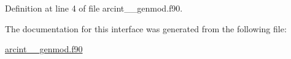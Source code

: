 Definition at line 4 of file arcint\+\_\+\+\_\+genmod.\+f90.



The documentation for this interface was generated from the following file\+:\begin{DoxyCompactItemize}
\item 
\hyperlink{arcint____genmod_8f90}{arcint\+\_\+\+\_\+genmod.\+f90}\end{DoxyCompactItemize}
